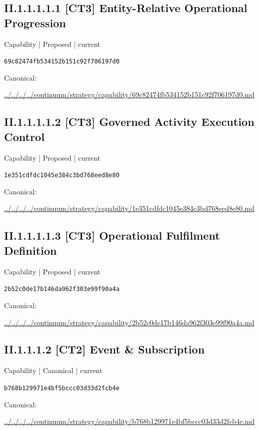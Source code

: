 \documentclass[10pt,a4paper]{article}
\begin{document}
\subsection*{II.1.1.1.1.1 [CT3] Entity-Relative Operational Progression}
\label{element-69c82474fb534152b151c92f706197d0}
{\small Capability | Proposed | current}\par
\texttt{69c82474fb534152b151c92f706197d0}\par
Canonical: \par
{\footnotesize\url{../../../../continuum/strategy/capability/69c82474fb534152b151c92f706197d0.md}}\par
\subsection*{II.1.1.1.1.2 [CT3] Governed Activity Execution Control}
\label{element-1e351cdfdc1045e384c3bd768eed8e80}
{\small Capability | Proposed | current}\par
\texttt{1e351cdfdc1045e384c3bd768eed8e80}\par
Canonical: \par
{\footnotesize\url{../../../../continuum/strategy/capability/1e351cdfdc1045e384c3bd768eed8e80.md}}\par
\subsection*{II.1.1.1.1.3 [CT3] Operational Fulfilment Definition}
\label{element-2b52c0de17b146da962f303e99f90a4a}
{\small Capability | Proposed | current}\par
\texttt{2b52c0de17b146da962f303e99f90a4a}\par
Canonical: \par
{\footnotesize\url{../../../../continuum/strategy/capability/2b52c0de17b146da962f303e99f90a4a.md}}\par
\subsection*{II.1.1.1.2 [CT2] Event \& Subscription}
\label{element-b768b129971e4bf5bccc03d33d2fcb4e}
{\small Capability | Canonical | current}\par
\texttt{b768b129971e4bf5bccc03d33d2fcb4e}\par
Canonical: \par
{\footnotesize\url{../../../../continuum/strategy/capability/b768b129971e4bf5bccc03d33d2fcb4e.md}}\par
\end{document}

